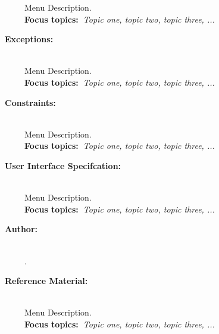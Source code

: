 \begin{description}
            Menu Description.~\\%
            {\textbf{Focus topics:~}\emph{Topic one, topic two, topic three, ...}}%
      \item[~\bfseries Exceptions:] \hfill \\%
            Menu Description.~\\%
            {\textbf{Focus topics:~}\emph{Topic one, topic two, topic three, ...}}%
      \item[~\bfseries Constraints:] \hfill \\%
            Menu Description.~\\%
            {\textbf{Focus topics:~}\emph{Topic one, topic two, topic three, ...}}%
      \item[~\bfseries User Interface Specifcation:] \hfill \\%
            Menu Description.~\\%
            {\textbf{Focus topics:~}\emph{Topic one, topic two, topic three, ...}}%
      \item[~\bfseries Author:] \hfill \\%
            \reportAuthor{}.~\\%
      \item[~\bfseries Reference Material:] \hfill \\%
            Menu Description.~\\%
            {\textbf{Focus topics:~}\emph{Topic one, topic two, topic three, ...}}%

\end{description}

